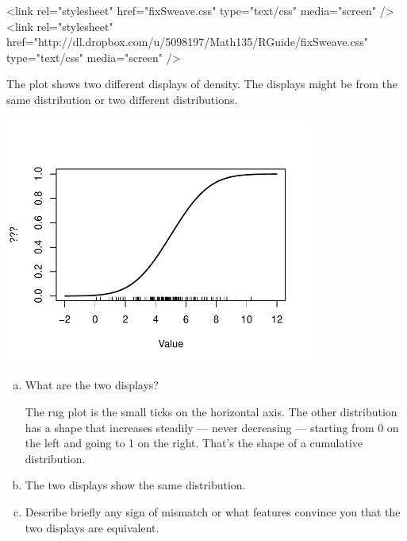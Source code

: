 



\providecommand{\HCode}[1]{#1} %
\HCode{<link rel="stylesheet" href="fixSweave.css" type="text/css"
  media="screen" />}
\HCode{<link rel="stylesheet" href="http://dl.dropbox.com/u/5098197/Math135/RGuide/fixSweave.css" type="text/css"
 media="screen" />}


The plot shows two different displays of density.  The displays might
be from the same distribution or two different distributions.


\centerline{\includegraphics[width=4in]{Figures/B103-2-exp.pdf}}

\begin{enumerate}[(a)]
\item What are the two displays?

\begin{MultipleChoice}
\end{MultipleChoice}

\begin{AnswerText}
The rug plot is the small ticks on the horizontal axis.  The other
distribution has a shape that increases steadily --- never decreasing --- starting from 0 on
the left and going to 1 on the right.  That's the shape of a
cumulative distribution.  
\end{AnswerText}

\item 
The two displays show the same distribution.  


\item Describe briefly any sign of mismatch or what features convince you
that the two displays are equivalent. \\
\TextEntry
\end{enumerate}

